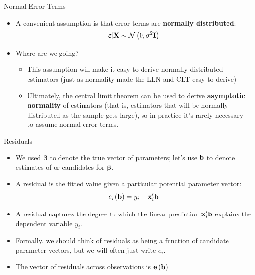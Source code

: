\begin{frame}{Normal Error Terms}
\begin{itemize}
	\item A convenient assumption 
	 is that error terms are {\bf normally distributed}:\[
		\boldsymbol{\varepsilon} | {\bf X} \sim \mathcal{N}\left(0,\sigma^2 {\bf I}\right)
	\]

	\medskip
	\item Where are we going?
	\begin{itemize}
		\item This assumption will make it easy to derive normally distributed estimators (just as
			normality made the LLN and CLT easy to derive)
		\item Ultimately, the central limit theorem can be used to derive {\bf asymptotic normality}
				of estimators (that is, estimators that will be normally distributed as the sample gets large),
				so in practice it's rarely necessary to assume normal error terms. 
	\end{itemize}

\end{itemize}
\end{frame}



\begin{frame}{Residuals}
\begin{itemize}
	\item We used $\boldsymbol{\beta}$ to denote the true vector of parameters; let's use
	${\bf b}$ to denote estimates of or candidates for $\boldsymbol{\beta}$.

	\item A residual is the fitted value given a particular potential parameter vector:\[
		e_i \left({\bf b}\right) = y_i - {\bf x}_i' {\bf b}
	\]

	\item A residual captures the degree to which the linear prediction ${\bf x}_i' {\bf b}$
	explains the dependent variable $y_{i}$.
	

	\item Formally, we should think of residuals as being a function of candidate parameter
	vectors, but we will often just write $e_i$. 


	\item The vector of residuals across observations is ${\bf e} \left({\bf b}\right)$
\end{itemize}
\end{frame}


